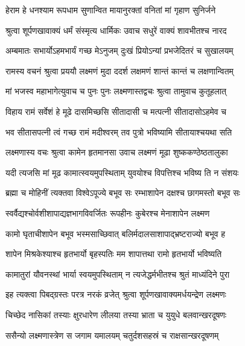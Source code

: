 
\twolineshloka
{हेराम हे धनश्याम रूपधाम सुणान्वित}
{मायानुरक्तां वनितां मां गृहाण सुनिर्जने}%


\twolineshloka
{श्रुत्वा शूर्पणखावाक्यं धर्मं संस्मृत्य धार्मिकः}
{उवाच सधुरें वाक्यं शावभीतश्च नारद}%


\twolineshloka
{अम्बमातः सभार्योऽहमभार्यं गच्छ मेऽनुजम्}
{दुःखं प्रियोऽन्यां प्रभजेदितरं च सुखालयम्}%


\twolineshloka
{रामस्य वचनं श्रुत्वा प्रययौ लक्ष्मणं मुदा}
{ददर्श लक्षमणं शान्तं कान्तं च लक्षणान्वितम्}%


\twolineshloka
{मां भजस्व महाभागेत्युवाच च पुनः पुनः}
{लक्ष्मणास्तद्वचः श्रुत्वा तामुवाच कुतूहलात्}%


\twolineshloka
{विहाय रामं सर्वेशं हे मूढे दासमिच्छसि}
{सीतादासी च मत्पत्नी सीतादासोऽहमेव च}%


\twolineshloka
{भव सीतासपत्नी त्वं गच्छ रामं मदीश्वरम्}
{तव पुत्रो भविष्यामि सीतायाश्चयथा सति}%


\twolineshloka
{लक्ष्मणास्य वचः श्रुत्वा कामेन हृतमानसा}
{उवाच लक्ष्मणं मूढा शुष्ककण्ठेष्ठतालुका}%


\twolineshloka
{यदी त्यजसि मां मूढ कामात्स्वयमुपस्थिताम्}
{युवयोश्च विपत्तिश्च भविष्य ति न संशयः}%


\twolineshloka
{ब्रह्मा च मोहिनीं त्यक्तवा विश्वेऽपूज्ये बभूव सः}
{रम्भाशापेन दक्षश्च छागमस्तो बभूव सः}%


\twolineshloka
{स्वर्वैद्यश्चोर्वशीशापाद्यज्ञभागविवर्जितः}
{रूपहीनः कुबेरश्च मेनाशापेन लक्ष्मण}%


\twolineshloka
{कामो घृताचीशापेन बभूव भस्मसाच्छिवात्}
{बलिर्मदालसाशापाद्भ्रष्टराज्यो बभूव ह}%


\twolineshloka
{शापेन मिश्रकेश्याश्च हृतभार्यो बृहस्पतिः}
{मम शापात्तथा रामो हृतभार्यो भविष्यति}%


\twolineshloka
{कामातुरां यौवनस्थां भार्या स्वयमुपस्थिताम्}
{न त्यजेद्धर्मभीतश्च श्रुतं माध्यंदिने पुरा}%


\twolineshloka
{इह त्यक्त्वा पिबद्ग्रस्तः परत्र नरकं व्रजेत्}
{श्रुत्वा शूर्पणखावाक्यमर्धयन्द्रेण लक्ष्मणः}%


\twolineshloka
{चिच्छेद नासिकां तस्याः क्षुरधारेण लीलया}
{तस्या भ्राता च युयुधे बलवान्खरदूषणः}%


\twolineshloka
{ससैन्यो लक्ष्मणास्त्रेण स जगाम यमालयम्}
{चतुर्दशसहस्रं च राक्षसान्खरदूषणम्}%


